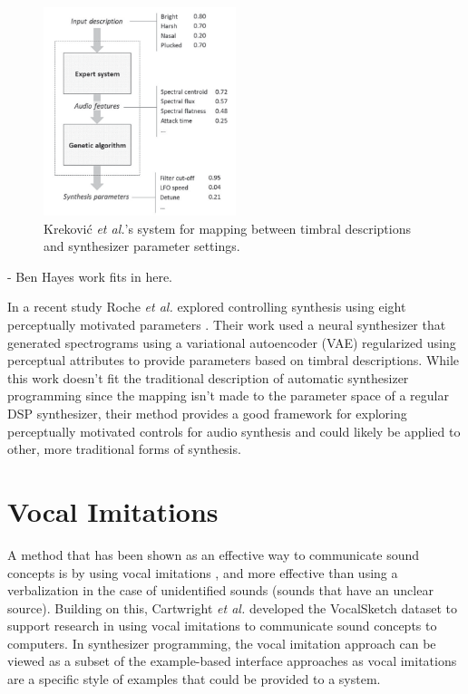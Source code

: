 \begin{figure}[ht]
    \centering
    \includegraphics[width=0.5\textwidth]{figures/background/krekovic-descriptive.png}
    \caption{Krekovi\'{c} \textit{et al.}'s \cite{krekovic2016algorithm} system for mapping between timbral descriptions and synthesizer parameter settings. }
    \label{fig:krekovic-desc}
\end{figure}

- Ben Hayes work fits in here. 

In a recent study Roche \textit{et al.} explored controlling synthesis using eight perceptually motivated parameters \cite{roche2021make}. Their work used a neural synthesizer that generated spectrograms using a variational autoencoder (VAE) regularized using perceptual attributes to provide parameters based on timbral descriptions. While this work doesn't fit the traditional description of automatic synthesizer programming since the mapping isn't made to the parameter space of a regular DSP synthesizer, their method provides a good framework for exploring perceptually motivated controls for audio synthesis and could likely be applied to other, more traditional forms of synthesis.

\section{Vocal Imitations}
A method that has been shown as an effective way to communicate sound concepts is by using vocal imitations \cite{lemaitre2014effectiveness}, and more effective than using a verbalization in the case of unidentified sounds (sounds that have an unclear source). Building on this, Cartwright \textit{et al.} developed the VocalSketch dataset \cite{cartwright2015vocalsketch} to support research in using vocal imitations to communicate sound concepts to computers. In synthesizer programming, the vocal imitation approach can be viewed as a subset of the example-based interface approaches as vocal imitations are a specific style of examples that could be provided to a system.

